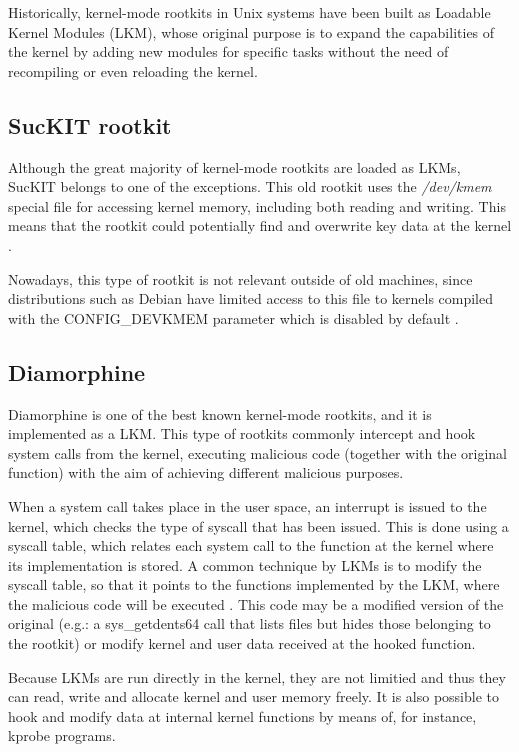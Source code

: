 Historically, kernel-mode rootkits in Unix systems have been built as Loadable Kernel Modules (LKM), whose original purpose is to expand the capabilities of the kernel by adding new modules for specific tasks without the need of recompiling or even reloading the kernel. 

\subsection{SucKIT rootkit}
Although the great majority of kernel-mode rootkits are loaded as LKMs, SucKIT \cite{suckit_rootkit} belongs to one of the exceptions. This old rootkit uses the \textit{/dev/kmem} special file \cite{dev_kmem} for accessing kernel memory, including both reading and writing. This means that the rootkit could potentially find and overwrite key data at the kernel \cite{suckit_lasamhna}.

Nowadays, this type of rootkit is not relevant outside of old machines, since distributions such as Debian have limited access to this file to kernels compiled with the CONFIG\_DEVKMEM parameter \cite{dev_kmem_debian} which is disabled by default \cite{dev_kmem_off_default}.

\subsection{Diamorphine}
Diamorphine \cite{diamorphine_github} is one of the best known kernel-mode rootkits, and it is implemented as a LKM. This type of rootkits commonly intercept and hook system calls from the kernel, executing malicious code (together with the original function) with the aim of achieving different malicious purposes.

When a system call takes place in the user space, an interrupt is issued to the kernel, which checks the type of syscall that has been issued. This is done using a syscall table, which relates each system call to the function at the kernel where its implementation is stored. A common technique by LKMs is to modify the syscall table, so that it points to the functions implemented by the LKM, where the malicious code will be executed \cite{incibe_rootkit_lkm}. This code may be a modified version of the original (e.g.: a sys\_getdents64 call that lists files but hides those belonging to the rootkit) or modify kernel and user data received at the hooked function.

Because LKMs are run directly in the kernel, they are not limitied and thus they can read, write and allocate kernel and user memory freely. It is also possible to hook and modify data at internal kernel functions by means of, for instance, kprobe programs.

